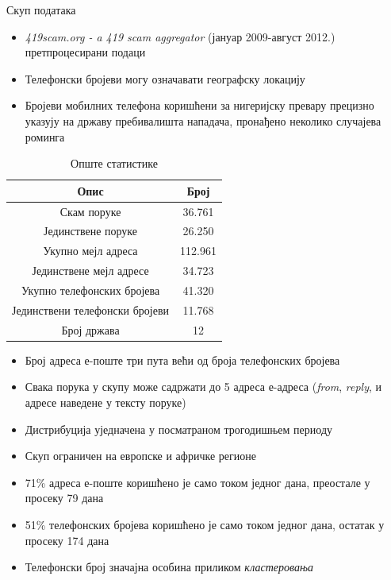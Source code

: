 \documentclass[compress, containsverbatim,mathserif, xcolor=dvipsnames, unicode]{beamer}
\begin{document}
\begin{frame}{Скуп података}

\begin{itemize}
	\item \emph{419scam.org - a 419 scam aggregator} (јануар 2009-август 2012.) претпроцесирани подаци
	\item Телефонски бројеви могу означавати географску локацију
	\item Бројеви мобилних телефона коришћени за нигеријску превару прецизно указују на државу пребивалишта нападача, пронађено неколико случајева роминга
\end{itemize}

\begin{table}[h!]
\begin{center}
\caption{Опште статистике}
\begin{tabular}{|c|c|} \hline
\textbf{Опис} & \textbf{Број} \\ \hline
Скам поруке & 36.761 \\ \hline
Јединствене поруке & 26.250\\ \hline
Укупно мејл адреса & 112.961\\ \hline
Јединствене мејл адресе & 34.723\\ \hline
Укупно телефонских бројева & 41.320\\ \hline
Јединствени телефонски бројеви & 11.768\\ \hline
Број држава & 12\\ \hline
\end{tabular}
\label{tab:tabela}
\end{center}
\end{table}

\end{frame}

\begin{frame}
\begin{itemize}
	\item Број адреса е-поште три пута већи од броја телефонских бројева
	\item Свака порука у скупу може садржати до 5 адреса е-адреса (\emph{from}, \emph{reply}, и адресе наведене у тексту поруке)
	\item Дистрибуција уједначена у посматраном трогодишњем периоду
	\item Скуп ограничен на европске и афричке регионе
	\item 71\% адреса е-поште коришћено је само током једног дана, преостале у просеку 79 дана
	\item 51\% телефонских бројева коришћено је само током једног дана, остатак у просеку 174 дана
	\item Телефонски број значајна особина приликом \emph{кластеровања}
\end{itemize}
\end{frame}
\end{document}
